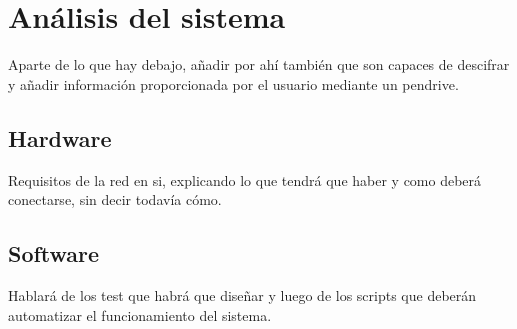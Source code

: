 \section{Análisis del sistema}
Aparte de lo que hay debajo, añadir por ahí también que son capaces de descifrar y añadir información proporcionada por el usuario mediante un pendrive.

\subsection{Hardware}
Requisitos de la red en si, explicando lo que tendrá que haber y como deberá conectarse, sin decir todavía cómo. 

\subsection{Software}
Hablará de los test que habrá que diseñar y luego de los scripts que deberán automatizar el funcionamiento del sistema.



%
%
%
%
%
%
%
%
%
%
%

